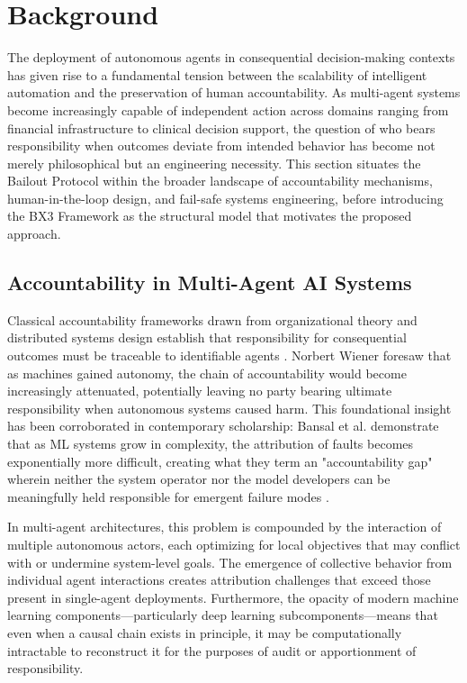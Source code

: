 \section{Background}

The deployment of autonomous agents in consequential decision-making contexts has given rise to a fundamental tension between the scalability of intelligent automation and the preservation of human accountability. As multi-agent systems become increasingly capable of independent action across domains ranging from financial infrastructure to clinical decision support, the question of who bears responsibility when outcomes deviate from intended behavior has become not merely philosophical but an engineering necessity. This section situates the Bailout Protocol within the broader landscape of accountability mechanisms, human-in-the-loop design, and fail-safe systems engineering, before introducing the BX3 Framework as the structural model that motivates the proposed approach.

\subsection{Accountability in Multi-Agent AI Systems}

Classical accountability frameworks drawn from organizational theory and distributed systems design establish that responsibility for consequential outcomes must be traceable to identifiable agents \cite{wiener1948}. Norbert Wiener foresaw that as machines gained autonomy, the chain of accountability would become increasingly attenuated, potentially leaving no party bearing ultimate responsibility when autonomous systems caused harm. This foundational insight has been corroborated in contemporary scholarship: Bansal et al. demonstrate that as ML systems grow in complexity, the attribution of faults becomes exponentially more difficult, creating what they term an "accountability gap" wherein neither the system operator nor the model developers can be meaningfully held responsible for emergent failure modes \cite{bansal2019}.

In multi-agent architectures, this problem is compounded by the interaction of multiple autonomous actors, each optimizing for local objectives that may conflict with or undermine system-level goals. The emergence of collective behavior from individual agent interactions creates attribution challenges that exceed those present in single-agent deployments. Furthermore, the opacity of modern machine learning components—particularly deep learning subcomponents—means that even when a causal chain exists in principle, it may be computationally intractable to reconstruct it for the purposes of audit or apportionment of responsibility.

